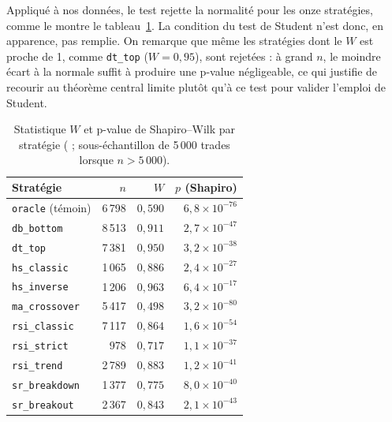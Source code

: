 Appliqué à nos données, le test rejette la normalité pour les onze
stratégies, comme le montre le tableau~\ref{tab:shapiro}. La condition du
test de Student n'est donc, en apparence, pas remplie. On remarque que même
les stratégies dont le \(W\) est proche de 1, comme \texttt{dt\_top}
($W = 0{,}95$), sont rejetées : à grand \(n\), le moindre écart à la normale
suffit à produire une p-value négligeable, ce qui justifie de recourir au
théorème central limite plutôt qu'à ce test pour valider l'emploi de Student.

\begin{table}[H]
\centering
\caption{Statistique \(W\) et p-value de Shapiro--Wilk par stratégie
(\edgevar{} ; sous-échantillon de 5\,000 trades lorsque \(n > 5\,000\)).}
\label{tab:shapiro}
\small
\begin{tabular}{@{}lrrr@{}}
\toprule
Stratégie & $n$ & $W$ & $p$ (Shapiro) \\
\midrule
\texttt{oracle} (témoin) & 6\,798 & $0{,}590$ & $6{,}8\times10^{-76}$ \\
\midrule
\texttt{db\_bottom}    & 8\,513 & $0{,}911$ & $2{,}7\times10^{-47}$ \\
\texttt{dt\_top}       & 7\,381 & $0{,}950$ & $3{,}2\times10^{-38}$ \\
\texttt{hs\_classic}   & 1\,065 & $0{,}886$ & $2{,}4\times10^{-27}$ \\
\texttt{hs\_inverse}   & 1\,206 & $0{,}963$ & $6{,}4\times10^{-17}$ \\
\texttt{ma\_crossover} & 5\,417 & $0{,}498$ & $3{,}2\times10^{-80}$ \\
\texttt{rsi\_classic}  & 7\,117 & $0{,}864$ & $1{,}6\times10^{-54}$ \\
\texttt{rsi\_strict}   &   978  & $0{,}717$ & $1{,}1\times10^{-37}$ \\
\texttt{rsi\_trend}    & 2\,789 & $0{,}883$ & $1{,}2\times10^{-41}$ \\
\texttt{sr\_breakdown} & 1\,377 & $0{,}775$ & $8{,}0\times10^{-40}$ \\
\texttt{sr\_breakout}  & 2\,367 & $0{,}843$ & $2{,}1\times10^{-43}$ \\
\bottomrule
\end{tabular}
\end{table}

